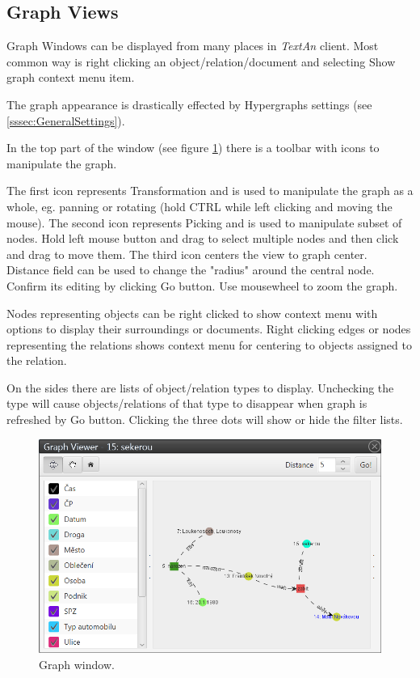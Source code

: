 \documentclass[12pt,a4paper]{report}
\newcommand{\textan}{\emph{TextAn}}
\begin{document}
\subsection{Graph Views}
\label{ssec:Graphs}

Graph Windows can be displayed from many places in \textan{} client. Most
common way is right clicking an object/relation/document and selecting Show
graph context menu item.

The graph appearance is drastically effected by Hypergraphs settings (see
\ref{sssec:GeneralSettings}).

In the top part of the window (see figure \ref{fig:Graph}) there is a toolbar
with icons to manipulate the graph.

The first icon represents Transformation and is used to manipulate the graph as a whole, eg. panning or rotating (hold CTRL while left clicking and moving the
mouse). The second icon represents Picking and is used to manipulate subset of
nodes. Hold left mouse button and drag to select multiple nodes and then click
and drag to move them. The third icon centers the view to graph center.
Distance field can be used to change the "radius" around the central node.
Confirm its editing by clicking Go button. Use mousewheel to zoom the graph.

Nodes representing objects can be right clicked to show context menu with
options to display their surroundings or documents. Right clicking edges or
nodes representing the relations shows context menu for centering to objects
assigned to the relation.

On the sides there are lists of object/relation types to display. Unchecking
the type will cause objects/relations of that type to disappear when graph is refreshed by Go button. Clicking the three dots will show or hide the filter
lists.

\begin{figure}[!htb]
        \centering
        \includegraphics[width=\textwidth]{Images/graph}
        \caption{Graph window.}
        \label{fig:Graph}
\end{figure}
\end{document}

